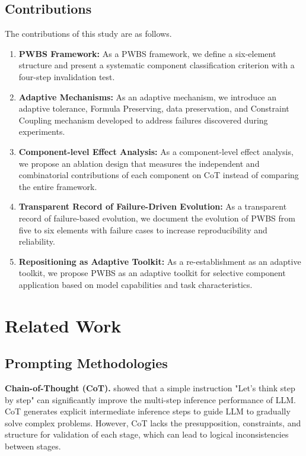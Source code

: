 \documentclass[11pt,a4paper]{article}
\begin{document}
\subsection{Contributions}

The contributions of this study are as follows.

\begin{enumerate}[leftmargin=2em]
  \item \textbf{PWBS Framework:} As a PWBS framework, we define a six-element structure and present a systematic component classification criterion with a four-step invalidation test.

  \item \textbf{Adaptive Mechanisms:} As an adaptive mechanism, we introduce an adaptive tolerance, Formula Preserving, data preservation, and Constraint Coupling mechanism developed to address failures discovered during experiments.

  \item \textbf{Component-level Effect Analysis:} As a component-level effect analysis, we propose an ablation design that measures the independent and combinatorial contributions of each component on CoT instead of comparing the entire framework.

  \item \textbf{Transparent Record of Failure-Driven Evolution:} As a transparent record of failure-based evolution, we document the evolution of PWBS from five to six elements with failure cases to increase reproducibility and reliability.

  \item \textbf{Repositioning as Adaptive Toolkit:} As a re-establishment as an adaptive toolkit, we propose PWBS as an adaptive toolkit for selective component application based on model capabilities and task characteristics.
\end{enumerate}

\section{Related Work}

\subsection{Prompting Methodologies}

\textbf{Chain-of-Thought (CoT).} \citet{wei2022chain} showed that a simple instruction "Let's think step by step" can significantly improve the multi-step inference performance of LLM. CoT generates explicit intermediate inference steps to guide LLM to gradually solve complex problems. However, CoT lacks the presupposition, constraints, and structure for validation of each stage, which can lead to logical inconsistencies between stages.
\end{document}
